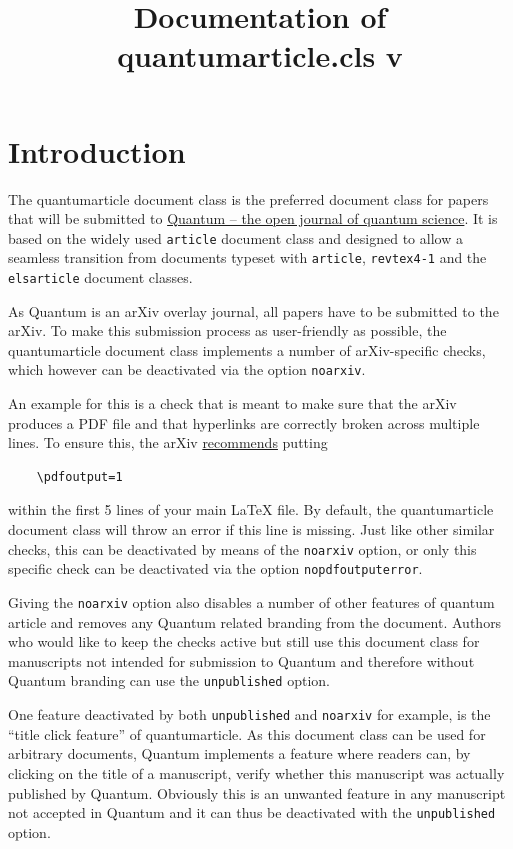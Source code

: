 \documentclass[a4paper,noarxiv,onecolumn]{quantumarticle}
\begin{document}
	\title{Documentation of quantumarticle.cls v\quantumarticleversion}
	\maketitle

	\tableofcontents

	\clearpage

	\section{Introduction}
	The quantumarticle document class is the preferred document class for papers that will be submitted to \href{https://quantum-journal.org/}{Quantum -- the open journal of quantum science}. It is based on the widely used \texttt{article} document class and designed to allow a seamless transition from documents typeset with \texttt{article}, \texttt{revtex4-1} and the \texttt{elsarticle} document classes.

	As Quantum is an arXiv overlay journal, all papers have to be submitted to the arXiv. To make this submission process as user-friendly as possible, the quantumarticle document class implements a number of arXiv-specific checks, which however can be deactivated via the option \texttt{noarxiv}.

        An example for this is a check that is meant to make sure that the arXiv produces a PDF file and that hyperlinks are correctly broken across multiple lines.
        To ensure this, the arXiv \href{https://arxiv.org/help/submit_tex}{recommends} putting
	\begin{verbatim}
	\pdfoutput=1
	\end{verbatim}
	within the first 5 lines of your main LaTeX file. By default, the quantumarticle document class will throw an error if this line is missing. Just like other similar checks, this can be deactivated by means of the \texttt{noarxiv} option, or only this specific check can be deactivated via the option \texttt{nopdfoutputerror}.

        Giving the \texttt{noarxiv} option also disables a number of other features of quantum article and removes any Quantum related branding from the document. Authors who would like to keep the checks active but still use this document class for manuscripts not intended for submission to Quantum and therefore without Quantum branding can use the \texttt{unpublished} option.

        One feature deactivated by both \texttt{unpublished} and \texttt{noarxiv} for example, is the ``title click feature'' of quantumarticle. As this document class can be used for arbitrary documents, Quantum implements a feature where readers can, by clicking on the title of a manuscript, verify whether this manuscript was actually published by Quantum. Obviously this is an unwanted feature in any manuscript not accepted in Quantum and it can thus be deactivated with the \texttt{unpublished} option.
\end{document}
